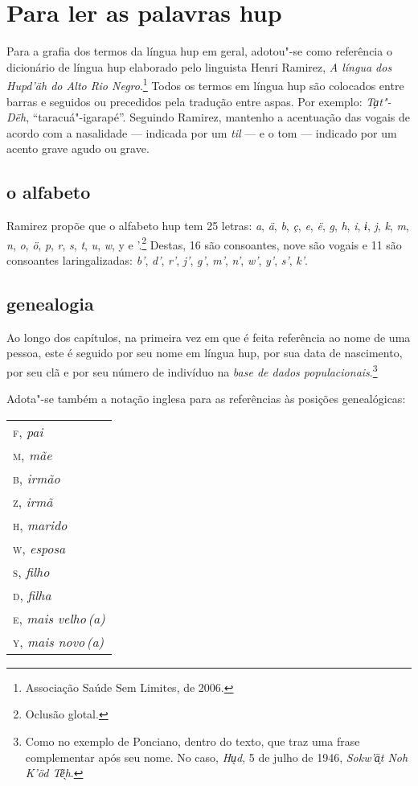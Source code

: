 \chapter{Para ler as palavras hup}

Para a grafia dos termos da língua hup em geral, adotou"-se como
referência o dicionário de língua hup elaborado pelo linguista Henri
Ramirez, \textit{A língua dos Hupd'äh do Alto Rio Negro}.\footnote{Associação Saúde
Sem Limites, de 2006.} Todos os termos em língua hup são colocados entre
barras e seguidos ou precedidos pela tradução entre aspas. Por exemplo: 
\textit{Ta̗t"-Dëh}, ``taracuá"-igarapé''. Seguindo Ramirez, mantenho a acentuação
das vogais de acordo com a nasalidade --- indicada por um \textit{til} --- e o tom --- indicado por um acento grave agudo ou grave.

\section{o alfabeto}

Ramirez propõe que o alfabeto hup tem 25 letras: \textit{a}, \textit{ä}, \textit{b}, \textit{ç}, \textit{e}, \textit{ë}, \textit{g},
\textit{h}, \textit{i}, \textit{ɨ}, \textit{j}, \textit{k}, \textit{m}, \textit{n}, \textit{o}, \textit{ö}, \textit{p}, \textit{r}, \textit{s}, \textit{t}, \textit{u}, \textit{w}, y e '.\footnote{Oclusão
glotal.} Destas, 16 são consoantes, nove são vogais e 11 são consoantes
laringalizadas: \textit{b'}, \textit{d'}, \textit{r'}, \textit{j'}, \textit{g'}, \textit{m'}, \textit{n'}, \textit{w'}, \textit{y'}, \textit{s'}, \textit{k'}.

\section{genealogia}

Ao longo dos capítulos, na primeira vez em que é feita referência ao nome de
uma pessoa, este é seguido por seu nome em língua hup, por sua data de
nascimento, por seu clã e por seu número de indivíduo na \textit{base de dados
populacionais}.\footnote{Como no exemplo de Ponciano, dentro do texto, que traz uma frase complementar após seu nome. No caso, \textit{Hu̖d}, 5 de julho de 1946, \textit{Sokw'ä̗t Noh K'öd Tẽ̖h}.} 

Adota"-se também a notação inglesa para as referências às posições genealógicas:

\begingroup
\begin{tabular}{l}
\textsc{f}, \textit{pai}\\
\textsc{m}, \textit{mãe}\\
\textsc{b}, \textit{irmão}\\
\textsc{z}, \textit{irmã}\\
\textsc{h}, \textit{marido}\\
\textsc{w}, \textit{esposa}\\
\textsc{s}, \textit{filho}\\
\textsc{d}, \textit{filha}\\
\textsc{e}, \textit{mais velho\,(a)}\\
\textsc{y}, \textit{mais novo\,(a)}\\
\end{tabular}

